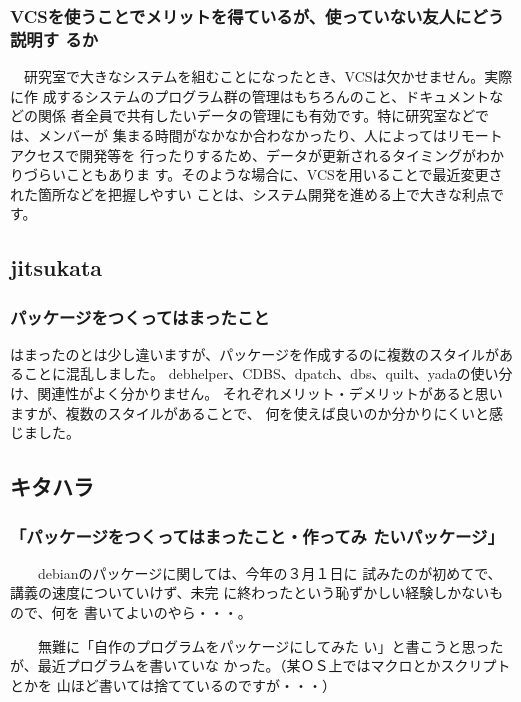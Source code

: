 \documentclass[mingoth,a4paper]{jsarticle}
\begin{document}
\subsubsection{VCSを使うことでメリットを得ているが、使っていない友人にどう説明す
るか}

　研究室で大きなシステムを組むことになったとき、VCSは欠かせません。実際に作 
成するシステムのプログラム群の管理はもちろんのこと、ドキュメントなどの関係 
者全員で共有したいデータの管理にも有効です。特に研究室などでは、メンバーが 
集まる時間がなかなか合わなかったり、人によってはリモートアクセスで開発等を 
行ったりするため、データが更新されるタイミングがわかりづらいこともありま 
す。そのような場合に、VCSを用いることで最近変更された箇所などを把握しやすい 
ことは、システム開発を進める上で大きな利点です。

\subsection{jitsukata}

\subsubsection{パッケージをつくってはまったこと}

はまったのとは少し違いますが、パッケージを作成するのに複数のスタイルがあることに混乱しました。
debhelper、CDBS、dpatch、dbs、quilt、yadaの使い分け、関連性がよく分かりません。
それぞれメリット・デメリットがあると思いますが、複数のスタイルがあることで、
何を使えば良いのか分かりにくいと感じました。

\subsection{キタハラ}

\subsubsection{「パッケージをつくってはまったこと・作ってみ
たいパッケージ」
}
　　debianのパッケージに関しては、今年の３月１日に
試みたのが初めてで、講義の速度についていけず、未完
に終わったという恥ずかしい経験しかないもので、何を
書いてよいのやら・・・。

　　無難に「自作のプログラムをパッケージにしてみた
い」と書こうと思ったが、最近プログラムを書いていな
かった。（某ＯＳ上ではマクロとかスクリプトとかを
山ほど書いては捨てているのですが・・・）　


\end{document}
